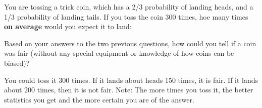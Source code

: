 \documentclass[12pt]{exam}
\begin{document}
\begin{questions}
\question You are tossing a trick coin, which has a 2/3 probability of landing heads, and a 1/3 probability of landing tails. If you toss the coin 300 times, hoe many times \textbf{on average}	 would you expect it to land:
	
\question Based on your answers to the two previous questions, how could you tell if a coin was fair (without any special equipment or knowledge of how coins can be biased)?
	\begin{TheSolution}
		You could toss it 300 times. If it lands about heads 150 times, it is fair. If it lands about 200 times, then it is not fair. Note: The more times you toss it, the better statistics you get and the more certain you are of the answer.
	\end{TheSolution}
	

\end{questions}
\end{document}
